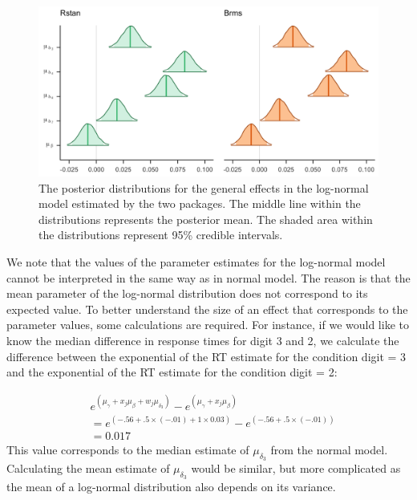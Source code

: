 \documentclass[
  english,
  doc,floatsintext]{apa6}
\begin{document}
\begin{figure}[H]

\includegraphics[width=1\linewidth]{Images/Fig13_posteriormulog_v2} \hfill{}

\caption{The posterior distributions for the general effects in the log-normal model estimated by the two packages. The middle line within the distributions represents the posterior mean. The shaded area within the distributions represent 95\% credible intervals.}\label{fig:postplotlog}
\end{figure}

We note that the values of the parameter estimates for the log-normal model cannot be interpreted in the same way as in normal model. The reason is that the mean parameter of the log-normal distribution does not correspond to its expected value. To better understand the size of an effect that corresponds to the parameter values, some calculations are required. For instance, if we would like to know the median difference in response times for digit 3 and 2, we calculate the difference between the exponential of the RT estimate for the condition digit = 3 and the exponential of the RT estimate for the condition digit = 2:

\begin{equation}
\begin{aligned}
&e^{(\mu_{\gamma} + x_j \mu_{\beta} + w_j \mu_{\delta_{3}})} - e^{(\mu_{\gamma} +  x_j \mu_{\beta})} \\
&= e^{(-.56 + .5 \times (-.01) + 1 \times 0.03)} - e^{(-.56 + .5 \times (-.01))} \\ 
&= 0.017 
\end{aligned}
\end{equation}
This value corresponds to the median estimate of \(\mu_{\delta_{3}}\) from the normal model. Calculating the mean estimate of \(\mu_{\delta_{3}}\) would be similar, but more complicated as the mean of a log-normal distribution also depends on its variance.
\end{document}
